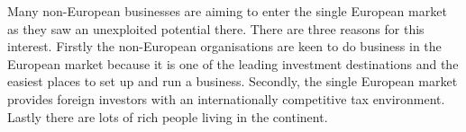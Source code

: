 \documentclass{article}
\begin{document}
{\Large	


Many non-European businesses are aiming to enter the single European market as they saw an unexploited potential there. There are three reasons for this interest. Firstly the non-European organisations are keen to do business in the European market because it is one of the leading investment destinations and the easiest places to set up and run a business. Secondly, the single European market provides foreign investors with an internationally competitive tax environment. Lastly there are lots of rich people living in the continent. 


}
\end{document}
